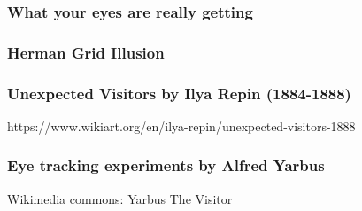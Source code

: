 \documentclass[12pt]{beamer}\usepackage[]{graphicx}\usepackage[]{color}
\begin{document}

\begin{frame}
\frametitle{What your eyes are really getting}
\begin{center}
\end{center}
\end{frame}


\begin{frame}
\begin{center}
\Huge{}
\end{center}
\end{frame}


\begin{frame}
\frametitle{Herman Grid Illusion}
\begin{center}
\end{center}
\end{frame}


\begin{frame}
\frametitle{Unexpected Visitors by Ilya Repin (1884-1888)}
\begin{center}

{\lolit \scriptsize{https://www.wikiart.org/en/ilya-repin/unexpected-visitors-1888}}
\end{center}
\end{frame}


\begin{frame}
\frametitle{Eye tracking experiments by Alfred Yarbus}
\begin{center}

{\lolit \scriptsize{Wikimedia commons: Yarbus The Visitor}}
\end{center}
\end{frame}


\begin{frame}
\begin{center}
\Huge{}
\end{center}
\end{frame}
\end{document}
